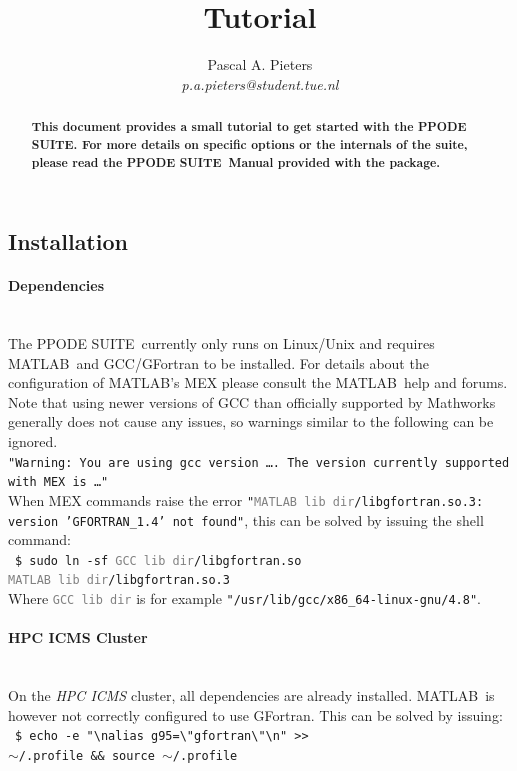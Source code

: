 \documentclass[a4paper,10pt,twocolumn]{article}
\title{\textbf{\PPODESUITE}\\Tutorial}
\author{Pascal A. Pieters\\\small{\textit{p.a.pieters@student.tue.nl}}}
\newcommand{\PPODESUITE}{PPODE SUITE}
\newcommand{\MATLAB}{MATLAB}
\newcommand{\shellcmd}[1]{\\\indent~\texttt{\footnotesize \$ #1}\\}
\newcommand{\ph}[1]{\texttt{\footnotesize \textcolor{gray}{\textlangle #1\textrangle}}}
\begin{document}
\maketitle

\begin{abstract}
\textbf{This document provides a small tutorial to get started with the \PPODESUITE. For more details on specific options or the internals of the suite, please read the \PPODESUITE~Manual provided with the package.}
\end{abstract}

\subsection*{Installation}
\paragraph{Dependencies}\mbox{}\\
The \PPODESUITE~currently only runs on Linux/Unix and requires \MATLAB~and GCC/GFortran to be installed. For details about the configuration of \MATLAB's MEX please consult the \MATLAB~help and forums. Note that using newer versions of GCC than officially supported by Mathworks generally does not cause any issues, so warnings similar to the following can be ignored.\\
\texttt{\small{"Warning: You are using gcc version \dots.  The version currently supported with MEX is \dots"}}\\
When MEX commands raise the error \texttt{\small{"\ph{\MATLAB~lib dir}/libgfortran.so.3: version 'GFORTRAN\_1.4' not found"}}, this can be solved by issuing the shell command: \shellcmd{sudo ln -sf \ph{GCC~lib dir}/libgfortran.so \\ \ph{\MATLAB~lib dir}/libgfortran.so.3} Where \ph{GCC lib dir} is for example \texttt{\small{"/usr/lib/gcc/x86\_64-linux-gnu/4.8"}}.

\paragraph{HPC ICMS Cluster}\mbox{}\\
On the \textit{HPC ICMS} cluster, all dependencies are already installed. \MATLAB~is however not correctly configured to use GFortran. This can be solved by issuing: \shellcmd{echo -e "{\textbackslash}nalias g95=\textbackslash"gfortran\textbackslash"{\textbackslash}n" {>}{>}\\ $\sim$/.profile \&\& source $\sim$/.profile}
\end{document}
